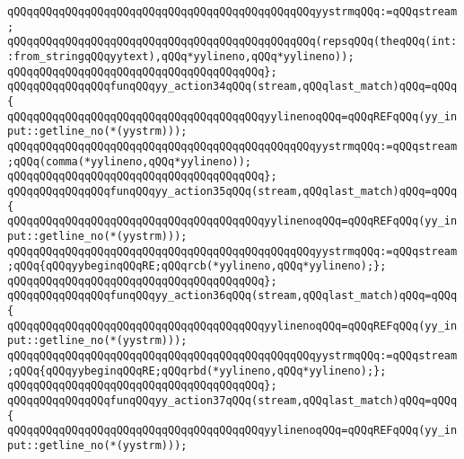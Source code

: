 \newline
\verb|qQQqqQQqqQQqqQQqqQQqqQQqqQQqqQQqqQQqqQQqqQQqqQQqyystrmqQQq:=qQQqstream;|\newline
\verb|qQQqqQQqqQQqqQQqqQQqqQQqqQQqqQQqqQQqqQQqqQQqqQQq(repsqQQq(theqQQq(int::from_stringqQQqyytext),qQQq*yylineno,qQQq*yylineno));|\newline
\verb|qQQqqQQqqQQqqQQqqQQqqQQqqQQqqQQqqQQqqQQq};|\newline
\verb|qQQqqQQqqQQqqQQqfunqQQqyy_action34qQQq(stream,qQQqlast_match)qQQq=qQQq{|\newline
\verb|qQQqqQQqqQQqqQQqqQQqqQQqqQQqqQQqqQQqqQQqyylinenoqQQq=qQQqREFqQQq(yy_input::getline_no(*(yystrm)));|\newline
\newline
\verb|qQQqqQQqqQQqqQQqqQQqqQQqqQQqqQQqqQQqqQQqqQQqqQQqyystrmqQQq:=qQQqstream;qQQq(comma(*yylineno,qQQq*yylineno));|\newline
\verb|qQQqqQQqqQQqqQQqqQQqqQQqqQQqqQQqqQQqqQQq};|\newline
\verb|qQQqqQQqqQQqqQQqfunqQQqyy_action35qQQq(stream,qQQqlast_match)qQQq=qQQq{|\newline
\verb|qQQqqQQqqQQqqQQqqQQqqQQqqQQqqQQqqQQqqQQqyylinenoqQQq=qQQqREFqQQq(yy_input::getline_no(*(yystrm)));|\newline
\newline
\verb|qQQqqQQqqQQqqQQqqQQqqQQqqQQqqQQqqQQqqQQqqQQqqQQqyystrmqQQq:=qQQqstream;qQQq{qQQqyybeginqQQqRE;qQQqrcb(*yylineno,qQQq*yylineno);};|\newline
\verb|qQQqqQQqqQQqqQQqqQQqqQQqqQQqqQQqqQQqqQQq};|\newline
\verb|qQQqqQQqqQQqqQQqfunqQQqyy_action36qQQq(stream,qQQqlast_match)qQQq=qQQq{|\newline
\verb|qQQqqQQqqQQqqQQqqQQqqQQqqQQqqQQqqQQqqQQqyylinenoqQQq=qQQqREFqQQq(yy_input::getline_no(*(yystrm)));|\newline
\newline
\verb|qQQqqQQqqQQqqQQqqQQqqQQqqQQqqQQqqQQqqQQqqQQqqQQqyystrmqQQq:=qQQqstream;qQQq{qQQqyybeginqQQqRE;qQQqrbd(*yylineno,qQQq*yylineno);};|\newline
\verb|qQQqqQQqqQQqqQQqqQQqqQQqqQQqqQQqqQQqqQQq};|\newline
\verb|qQQqqQQqqQQqqQQqfunqQQqyy_action37qQQq(stream,qQQqlast_match)qQQq=qQQq{|\newline
\verb|qQQqqQQqqQQqqQQqqQQqqQQqqQQqqQQqqQQqqQQqyylinenoqQQq=qQQqREFqQQq(yy_input::getline_no(*(yystrm)));|\newline
\newline

